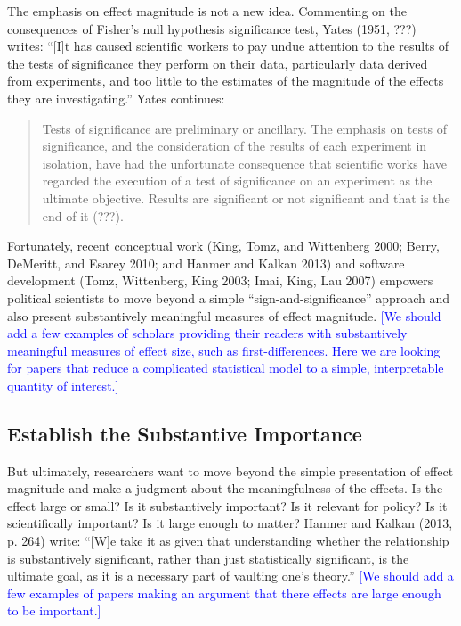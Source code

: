 \documentclass[12pt]{article}
\newcommand{\kelly}[1]{\textcolor{blue}{#1}}
\begin{document}
The emphasis on effect magnitude is not a new idea. Commenting on the consequences of Fisher's null hypothesis significance test, Yates (1951, ???) writes: ``[I]t has caused scientific workers to pay undue attention to the results of the tests of significance they perform on their data, particularly data derived from experiments, and too little to the estimates of the magnitude of the effects they are investigating.'' Yates continues: 

\begin{quote}
Tests of significance are preliminary or ancillary. The emphasis on tests of significance, and the consideration of the results of each experiment in isolation, have had the unfortunate consequence that scientific works have regarded the execution of a test of significance on an experiment as the ultimate objective. Results are significant or not significant and that is the end of it (???).
\end{quote}

Fortunately, recent conceptual work (King, Tomz, and Wittenberg 2000; Berry, DeMeritt, and Esarey 2010; and Hanmer and Kalkan 2013) and software development (Tomz, Wittenberg, King 2003; Imai, King, Lau 2007) empowers political scientists to move beyond a simple ``sign-and-significance'' approach and also present substantively meaningful measures of effect magnitude. \kelly{[We should add a few examples of scholars providing their readers with substantively meaningful measures of effect size, such as first-differences. Here we are looking for papers that reduce a complicated statistical model to a simple, interpretable quantity of interest.]}

\subsection*{Establish the Substantive Importance}

But ultimately, researchers want to move beyond the simple presentation of effect magnitude and make a judgment about the meaningfulness of the effects. Is the effect large or small? Is it substantively important? Is it relevant for policy? Is it scientifically important? Is it large enough to matter? Hanmer and Kalkan (2013, p. 264) write: ``[W]e take it as given that understanding whether the relationship is substantively significant, rather than just statistically significant, is the ultimate goal, as it is a necessary part of vaulting one's theory.'' \kelly{[We should add a few examples of papers making an argument that there effects are large enough to be important.]}
\end{document}

